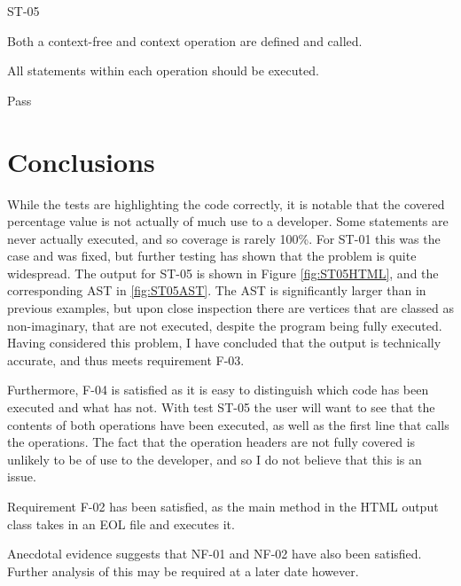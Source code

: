 \begin{samepage}
\begin{description}[style=sameline,leftmargin=3.5cm,nolistsep]
\item[\hspace*{0.3cm}Label] ST-05
\item[\hspace*{0.3cm}Description] Both a context-free and context operation are defined and called.
\item[\hspace*{0.3cm}Expected Output] All statements within each operation should be executed.
\item[\hspace*{0.3cm}Result] Pass
\end{description}
\end{samepage}

\section{Conclusions}

While the tests are highlighting the code correctly, it is notable that the covered percentage value is not actually of much use to a developer. Some statements are never actually executed, and so coverage is rarely 100\%. For ST-01 this was the case and was fixed, but further testing has shown that the problem is quite widespread. The output for ST-05 is shown in Figure \ref{fig:ST05HTML}, and the corresponding AST in \ref{fig:ST05AST}. The AST is significantly larger than in previous examples, but upon close inspection there are vertices that are classed as non-imaginary, that are not executed, despite the program being fully executed. Having considered this problem, I have concluded that the output is technically accurate, and thus meets requirement F-03. 

Furthermore, F-04 is satisfied as it is easy to distinguish which code has been executed and what has not. With test ST-05 the user will want to see that the contents of both operations have been executed, as well as the first line that calls the operations. The fact that the operation headers are not fully covered is unlikely to be of use to the developer, and so I do not believe that this is an issue.

Requirement F-02 has been satisfied, as the main method in the HTML output class takes in an EOL file and executes it. 

Anecdotal evidence suggests that NF-01 and NF-02 have also been satisfied. Further analysis of this may be required at a later date however.


